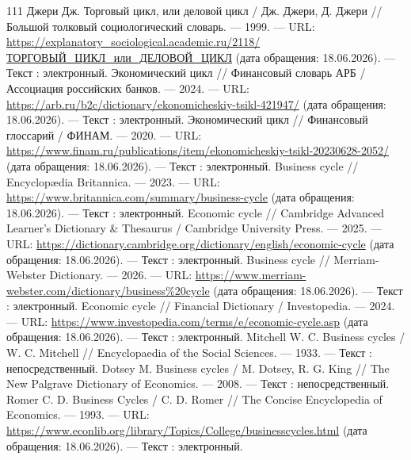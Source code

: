 \providecommand{\bibaccessdate}{18.06.2026}

\begin{RaggedRight}
\begin{thebibliography}{111}
     \hypertarget{bib:Джери-1999}{} Джери Дж. Торговый цикл, или деловой цикл / Дж. Джери, Д. Джери // Большой толковый социологический словарь. --- 1999. --- URL: \url{https://explanatory_sociological.academic.ru/2118/ТОРГОВЫЙ_ЦИКЛ_или_ДЕЛОВОЙ_ЦИКЛ} (дата обращения: \bibaccessdate). --- Текст : электронный.
     \hypertarget{bib:АРБ-2024}{} Экономический цикл // Финансовый словарь АРБ / Ассоциация российских банков. --- 2024. --- URL: \url{https://arb.ru/b2c/dictionary/ekonomicheskiy-tsikl-421947/} (дата обращения: \bibaccessdate). --- Текст : электронный.
     \hypertarget{bib:ФИНАМ-2020}{} Экономический цикл // Финансовый глоссарий / ФИНАМ. --- 2020. --- URL: \url{https://www.finam.ru/publications/item/ekonomicheskiy-tsikl-20230628-2052/} (дата обращения: \bibaccessdate). --- Текст : электронный.
     \hypertarget{bib:Britannica-2023}{} Business cycle // Encyclopædia Britannica. --- 2023. --- URL: \url{https://www.britannica.com/summary/business-cycle} (дата обращения: \bibaccessdate). --- Текст : электронный.
     \hypertarget{bib:Cambridge-2025}{} Economic cycle // Cambridge Advanced Learner’s Dictionary \& Thesaurus / Cambridge University Press. --- 2025. --- URL: \url{https://dictionary.cambridge.org/dictionary/english/economic-cycle} (дата обращения: \bibaccessdate). --- Текст : электронный.
     \hypertarget{bib:Merriam-Webster-2026}{} Business cycle // Merriam-Webster Dictionary. --- 2026. --- URL: \url{https://www.merriam-webster.com/dictionary/business%20cycle} (дата обращения: \bibaccessdate). --- Текст : электронный.
     \hypertarget{bib:Investopedia-2024}{} Economic cycle // Financial Dictionary / Investopedia. --- 2024. --- URL: \url{https://www.investopedia.com/terms/e/economic-cycle.asp} (дата обращения: \bibaccessdate). --- Текст : электронный.
     \hypertarget{bib:Mitchell-1933}{} Mitchell W. C. Business cycles / W. C. Mitchell // Encyclopaedia of the Social Sciences. --- 1933. --- Текст : непосредственный.
     \hypertarget{bib:Dotsey-2008}{} Dotsey M. Business cycles / M. Dotsey, R. G. King // The New Palgrave Dictionary of Economics. --- 2008. --- Текст : непосредственный.
     \hypertarget{bib:Romer-1993}{} Romer C. D. Business Cycles / C. D. Romer // The Concise Encyclopedia of Economics. --- 1993. --- URL: \url{https://www.econlib.org/library/Topics/College/businesscycles.html} (дата обращения: \bibaccessdate). --- Текст : электронный.

\end{thebibliography}
\end{RaggedRight}
